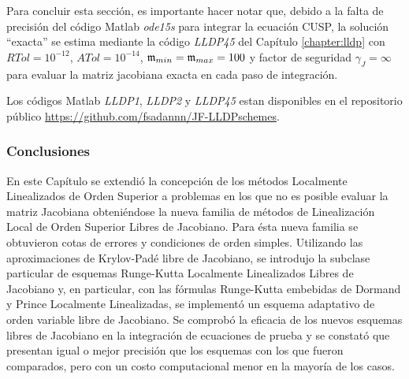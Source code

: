 Para concluir esta sección, es importante hacer notar que, debido a la falta de precisión del código Matlab \emph{ode15s} para integrar la ecuación CUSP, la solución ``exacta'' se estima mediante la código \emph{LLDP45} del Capítulo \ref{chapter:lldp} con $ RTol = 10^{-12} $, $ATol = 10^{-14}$, $\mathfrak{m}_{min } = \mathfrak{m}_{max} = 100$ y factor de seguridad $\gamma_J=\infty$ para evaluar la matriz jacobiana exacta en cada paso de integración.

Los códigos Matlab \emph{LLDP1}, \emph{LLDP2} y \emph{LLDP45} estan disponibles en el repositorio público \url{https://github.com/fsadannn/JF-LLDPschemes}.


\vspace{5cm}
\subsubsection{Conclusiones}
En este Capítulo se extendió la concepción de los métodos Localmente Linealizados de Orden Superior a problemas en los que no es posible evaluar la matriz Jacobiana obteniéndose la nueva familia de métodos de Linealización Local de Orden Superior Libres de Jacobiano. Para ésta nueva familia se obtuvieron cotas de errores y condiciones de orden simples. Utilizando las aproximaciones de Krylov-Padé libre de Jacobiano, se introdujo la subclase particular de esquemas Runge-Kutta Localmente Linealizados
Libres de Jacobiano y, en particular, con las fórmulas Runge-Kutta embebidas de Dormand y Prince Localmente Linealizadas, se implementó un esquema adaptativo de orden variable libre de Jacobiano. Se comprobó la eficacia de los nuevos esquemas libres de Jacobiano en la integración de
ecuaciones de prueba y se constató que presentan igual o mejor precisión que los esquemas con los que fueron comparados, pero con un costo computacional menor en la mayoría de los casos.

